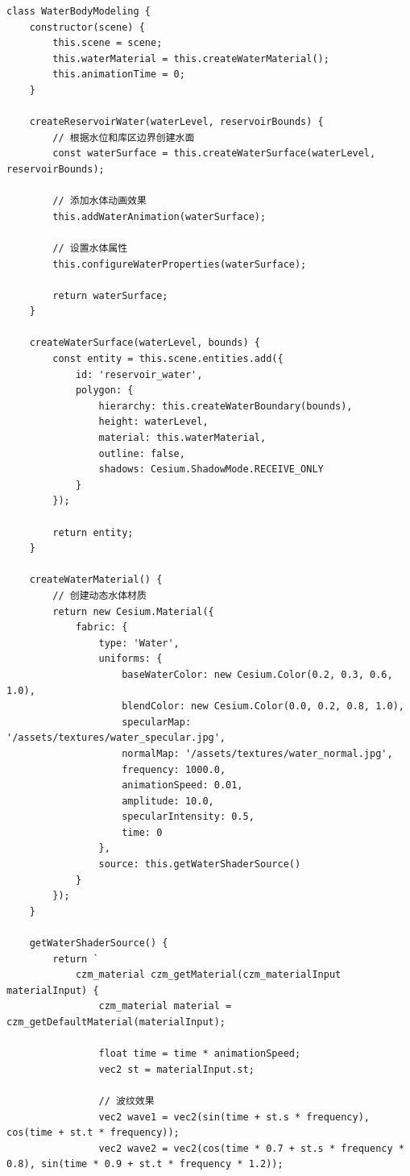 \begin{lstlisting}
class WaterBodyModeling {
    constructor(scene) {
        this.scene = scene;
        this.waterMaterial = this.createWaterMaterial();
        this.animationTime = 0;
    }
    
    createReservoirWater(waterLevel, reservoirBounds) {
        // 根据水位和库区边界创建水面
        const waterSurface = this.createWaterSurface(waterLevel, reservoirBounds);
        
        // 添加水体动画效果
        this.addWaterAnimation(waterSurface);
        
        // 设置水体属性
        this.configureWaterProperties(waterSurface);
        
        return waterSurface;
    }
    
    createWaterSurface(waterLevel, bounds) {
        const entity = this.scene.entities.add({
            id: 'reservoir_water',
            polygon: {
                hierarchy: this.createWaterBoundary(bounds),
                height: waterLevel,
                material: this.waterMaterial,
                outline: false,
                shadows: Cesium.ShadowMode.RECEIVE_ONLY
            }
        });
        
        return entity;
    }
    
    createWaterMaterial() {
        // 创建动态水体材质
        return new Cesium.Material({
            fabric: {
                type: 'Water',
                uniforms: {
                    baseWaterColor: new Cesium.Color(0.2, 0.3, 0.6, 1.0),
                    blendColor: new Cesium.Color(0.0, 0.2, 0.8, 1.0),
                    specularMap: '/assets/textures/water_specular.jpg',
                    normalMap: '/assets/textures/water_normal.jpg',
                    frequency: 1000.0,
                    animationSpeed: 0.01,
                    amplitude: 10.0,
                    specularIntensity: 0.5,
                    time: 0
                },
                source: this.getWaterShaderSource()
            }
        });
    }
    
    getWaterShaderSource() {
        return `
            czm_material czm_getMaterial(czm_materialInput materialInput) {
                czm_material material = czm_getDefaultMaterial(materialInput);
                
                float time = time * animationSpeed;
                vec2 st = materialInput.st;
                
                // 波纹效果
                vec2 wave1 = vec2(sin(time + st.s * frequency), cos(time + st.t * frequency));
                vec2 wave2 = vec2(cos(time * 0.7 + st.s * frequency * 0.8), sin(time * 0.9 + st.t * frequency * 1.2));
                

\end{lstlisting}
